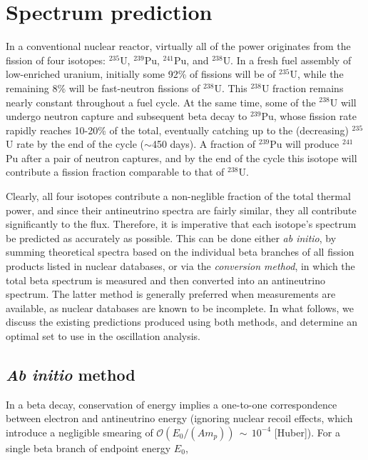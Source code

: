 \documentclass[../thesis.tex]{subfiles}
\begin{document}
\section{Spectrum prediction}
\label{sec:specpred}

\def\urfive{$^{235}$U\xspace}
\def\punine{$^{239}$Pu\xspace}
\def\puone{$^{241}$Pu\xspace}
\def\ureight{$^{238}$U\xspace}

In a conventional nuclear reactor, virtually all of the power originates from the fission of four isotopes: \urfive, \punine, \puone, and \ureight. In a fresh fuel assembly of low-enriched uranium, initially some 92\% of fissions will be of \urfive, while the remaining 8\% will be fast-neutron fissions of \ureight. This \ureight fraction remains nearly constant throughout a fuel cycle. At the same time, some of the \ureight will undergo neutron capture and subsequent beta decay to \punine, whose fission rate rapidly reaches 10-20\% of the total, eventually catching up to the (decreasing) \urfive rate by the end of the cycle ($\sim$450 days). A fraction of \punine will produce \puone after a pair of neutron captures, and by the end of the cycle this isotope will contribute a fission fraction comparable to that of \ureight.

Clearly, all four isotopes contribute a non-neglible fraction of the total thermal power, and since their antineutrino spectra are fairly similar, they all contribute significantly to the flux. Therefore, it is imperative that each isotope's spectrum be predicted as accurately as possible. This can be done either \emph{ab initio}, by summing theoretical spectra based on the individual beta branches of all fission products listed in nuclear databases, or via the \emph{conversion method}, in which the total beta spectrum is measured and then converted into an antineutrino spectrum. The latter method is generally preferred when measurements are available, as nuclear databases are known to be incomplete. In what follows, we discuss the existing predictions produced using both methods, and determine an optimal set to use in the oscillation analysis.

\subsection{\textit{Ab initio} method}
\label{sec:abinitio}

In a beta decay, conservation of energy implies a one-to-one correspondence between electron and antineutrino energy (ignoring nuclear recoil effects, which introduce a negligible smearing of $\mathcal{O}(E_0/(Am_p))\,\sim\,10^{-4}$ [Huber]). For a single beta branch of endpoint energy $E_0$,
\end{document}
